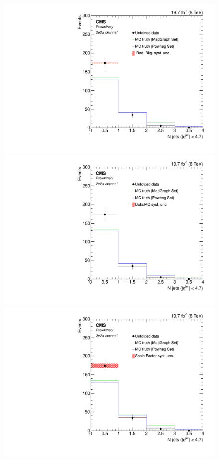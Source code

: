 \begin{figure}[hbtp]
\begin{center}
    \includegraphics[width=0.8\cmsFigWidth]{Figures/Unfolding/Systematics/ZZTo2e2m_Jets_RedBkg_Mad_fr}     
    \includegraphics[width=0.8\cmsFigWidth]{Figures/Unfolding/Systematics/ZZTo2e2m_Jets_UnfDataOverGenMC_Mad_fr}  
    \includegraphics[width=0.8\cmsFigWidth]{Figures/Unfolding/Systematics/ZZTo2e2m_Jets_SFSq_Mad_fr}                       

\end{center}
\end{figure}

